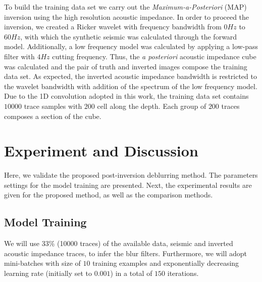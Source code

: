 \documentclass[journal]{IEEEtran}
\begin{document}
To build the training data set we carry out the \textit{Maximum-a-Posteriori} (MAP)
\cite{Buland2003,Figueiredo2012} inversion using the high resolution acoustic
impedance. In order to proceed the inversion, we created a Ricker wavelet with
frequency bandwidth from $0Hz$ to $60Hz$, with which the synthetic seismic was
calculated through the forward model. Additionally, a low frequency
model was calculated by applying a low-pass filter with $4Hz$ cutting frequency.
Thus, the \textit{a posteriori} acoustic impedance cube was calculated and the pair of truth
and inverted images compose the training data set. As expected, the inverted
acoustic impedance bandwidth is restricted to the wavelet bandwidth with
addition of the spectrum of the low frequency model. Due to the 1D
convolution adopted in this work, the training data set contains $10000$ trace
samples with $200$ cell along the depth. Each group of $200$ traces composes
a section of the cube.

\section{Experiment and Discussion}\label{Experiments}
Here, we validate the proposed post-inversion deblurring method.
The parameters settings for the model training are presented.
Next, the experimental results are given for the proposed method,
as well as the comparison methods.

\subsection{Model Training}
We will use 33\% (10000 traces)
of the available data, seismic and inverted acoustic impedance traces,
to infer the blur filters. Furthermore, we will adopt 
mini-batches with size of $10$ training examples and exponentially
decreasing learning rate (initially set to $0.001$)
in a total of $150$ iterations.
\end{document}

